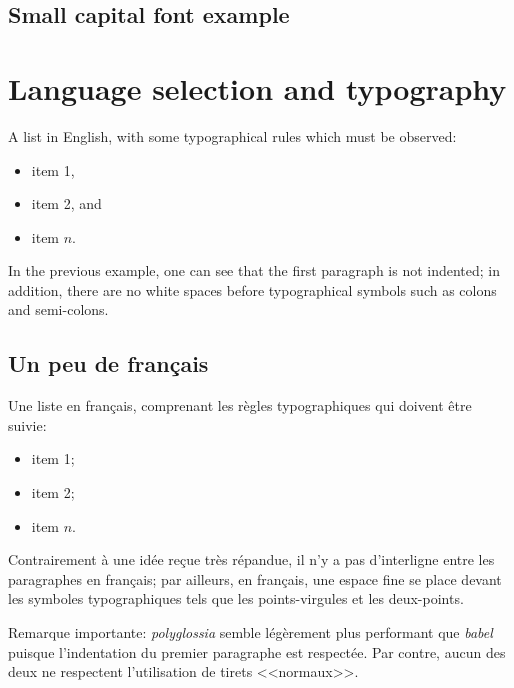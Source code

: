 \documentclass[11pt, a4paper]{report}
\begin{document}
		\textbf{\textit{\lipsum[1]}}
		
	
	\section{Small capital font example}
	
		\textsc{\lipsum[1]}
	

\chapter{Language selection and typography}

	A list in English, with some typographical rules which must be observed:
	\begin{itemize}
		\item item 1,
		\item item 2, and
		\item item $n$.
	\end{itemize}
	
	In the previous example, one can see that the first paragraph is not indented; in addition, there are no white spaces before typographical symbols such as colons and semi-colons.
	
	
	\begin{french}%
		\section{Un peu de français}
		
		Une liste en français, comprenant les règles typographiques qui doivent être suivie:
		\begin{itemize}
			\item item 1;
			\item item 2;
			\item item $n$.
		\end{itemize}
		
		Contrairement à une idée reçue très répandue, il n'y a pas d'interligne entre les paragraphes en français; par ailleurs, en français, une espace fine se place devant les symboles typographiques tels que les points-virgules et les deux-points.
		
		Remarque importante: \textit{polyglossia} semble légèrement plus performant que \textit{babel} puisque l'indentation du premier paragraphe est respectée. Par contre, aucun des deux ne respectent l'utilisation de tirets <<normaux>>.
	\end{french}

\end{document}
